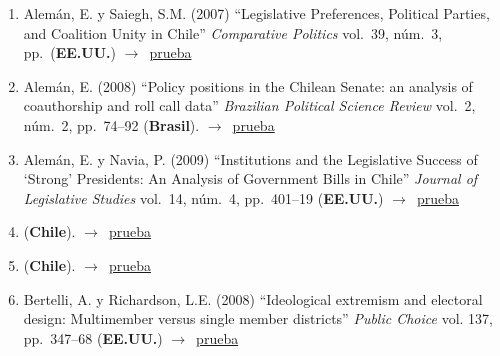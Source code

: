 \documentclass[12 pt, letter]{article}
\newenvironment{CitasMiTrabajo}{
    \begin{footnotesize}
    \begin{enumerate}[label={\footnotesize\emph{cita~\arabic*}},ref=\arabic*] %
        \setlength{\itemsep}{.1\itemsep}
        \setlength{\parskip}{.1\parskip}
    }{\end{enumerate}\end{footnotesize}}
\begin{document}

        \begin{CitasMiTrabajo}

        \item Alem\'an, E. y Saiegh, S.M. (2007)
        ``Legislative Preferences,
        Political Parties, and Coalition Unity in Chile'' \emph{Comparative
        Politics} vol.\ 39, n\'um.\ 3, pp.\ (\textbf{EE.UU.}) $\rightarrow$~\href{https://github.com/emagar/cv/blob/master/citasMiTrab/mrs/alemanSaiegh07.pdf}{prueba}

        \item Alem\'an, E. (2008)
        ``Policy positions in the Chilean Senate: an analysis of coauthorship and roll call data''
        \emph{Brazilian Political Science Review}
        vol.\ 2, n\'um.\ 2, pp.\ 74--92 (\textbf{Brasil}). $\rightarrow$~\href{https://github.com/emagar/cv/blob/master/citasMiTrab/mrs/alemanCosponsorChile2008brjps.excerpt.pdf}{prueba}

        \item Alem\'an, E. y Navia, P. (2009)
        ``Institutions and the Legislative Success of `Strong'
        Presidents: An Analysis of Government Bills in Chile''
        \emph{Journal of Legislative Studies}
        vol.\ 14, n\'um.\ 4, pp.\ 401--19 (\textbf{EE.UU.}) $\rightarrow$~\href{https://github.com/emagar/cv/blob/master/citasMiTrab/mrs/alemanNavia.pdf}{prueba}

        \item {} (\textbf{Chile}). $\rightarrow$~\href{https://www.redalyc.org/pdf/960/96040292002.pdf}{prueba}
        
        \item {} (\textbf{Chile}). $\rightarrow$~\href{https://journals.sagepub.com/doi/full/10.1177/1866802X1801000101}{prueba}
        
        \item Bertelli, A. y Richardson, L.E. (2008)
        ``Ideological extremism and electoral design: Multimember versus
        single member districts'' \emph{Public Choice} vol. 137, pp.\
        347--68  (\textbf{EE.UU.}) $\rightarrow$~\href{https://github.com/emagar/cv/blob/master/citasMiTrab/mrs/bertelli.pdf}{prueba}
        

\end{CitasMiTrabajo}
\end{document}
